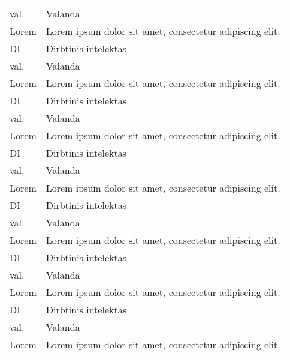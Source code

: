 \begin{longtable}[l]{ p{3cm} p{8cm} }
        val.  & Valanda\\ 
        Lorem & Lorem ipsum dolor sit amet, consectetur adipiscing elit.\\
        DI    & Dirbtinis intelektas\\ 
        val.  & Valanda\\ 
        Lorem & Lorem ipsum dolor sit amet, consectetur adipiscing elit.\\
        DI    & Dirbtinis intelektas\\ 
        val.  & Valanda\\ 
        Lorem & Lorem ipsum dolor sit amet, consectetur adipiscing elit.\\
        DI    & Dirbtinis intelektas\\ 
        val.  & Valanda\\ 
        Lorem & Lorem ipsum dolor sit amet, consectetur adipiscing elit.\\
        DI    & Dirbtinis intelektas\\ 
        val.  & Valanda\\ 
        Lorem & Lorem ipsum dolor sit amet, consectetur adipiscing elit.\\
        DI    & Dirbtinis intelektas\\ 
        val.  & Valanda\\ 
        Lorem & Lorem ipsum dolor sit amet, consectetur adipiscing elit.\\
        DI    & Dirbtinis intelektas\\ 
        val.  & Valanda\\ 
        Lorem & Lorem ipsum dolor sit amet, consectetur adipiscing elit.
    \label{tab:acronyms}
\end{longtable}
